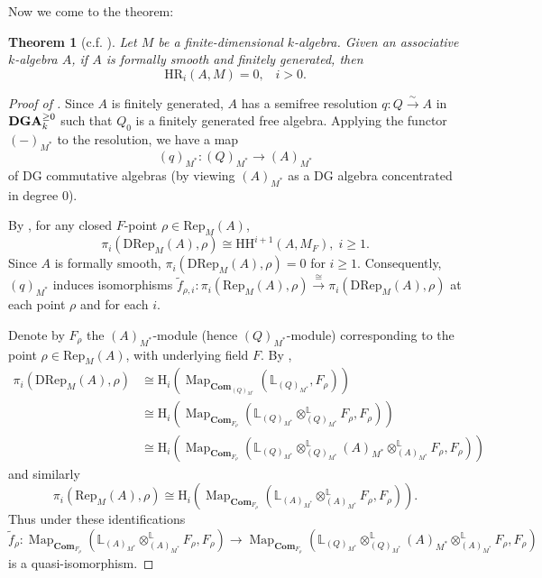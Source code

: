 \documentclass{article}
\numberwithin{equation}{section} %
\theoremstyle{plain}
\newtheorem{theorem}{Theorem}[section]
\theoremstyle{definition}
\theoremstyle{remark}
\begin{document}
Now we come to the theorem:

\begin{theorem}[{c.f. \cite[Theorem 21]{BFR14}}]\label{Thm_SmoothnessHigherVanishing}
Let $M$ be a finite-dimensional $k$-algebra.
Given an associative $k$-algebra $A$, if $A$ is formally smooth and finitely generated, then
\begin{equation*}
\mathrm{HR}_i(A,M)=0,\;\;\;i>0.
\end{equation*}
\end{theorem}

\begin{proof}[Proof of ]
Since $A$ is finitely generated, $A$ has a semifree resolution $q:Q\xrightarrow{\sim}A$ in ${\bf DGA}_k^{\geq0}$ such that $Q_0$ is a finitely generated free algebra.
Applying the functor $(-)_{M^*}$ to the resolution, we have a map
\begin{equation*}
(q)_{M^*}:(Q)_{M^*}\to(A)_{M^*}
\end{equation*}
of DG commutative algebras (by viewing $(A)_{M^*}$ as a DG algebra concentrated in degree $0$).

By , for any closed $F$-point $\rho\in\mathrm{Rep}_M(A)$,
\begin{equation*}
\pi_i(\mathrm{DRep}_M(A),\rho)\cong\mathrm{HH}^{i+1}(A,M_F),\;i\geq1.
\end{equation*}
Since $A$ is formally smooth, $\pi_i(\mathrm{DRep}_M(A),\rho)=0$ for $i\geq1$.
Consequently, $(q)_{M^*}$ induces isomorphisms $\tilde{f}_{\rho,i}:\pi_i(\mathrm{Rep}_M(A),\rho)\xrightarrow{\cong}\pi_i(\mathrm{DRep}_M(A),\rho)$ at each point $\rho$ and for each $i$.

Denote by $F_\rho$ the $(A)_{M^*}$-module (hence $(Q)_{M^*}$-module) corresponding to the point $\rho\in\mathrm{Rep}_M(A)$, with underlying field $F$.
By ,
\begin{align*}
\pi_i(\mathrm{DRep}_M(A),\rho)&\cong\mathrm{H}_i(\operatorname{Map}_{\mathbf{Com}_{(Q)_{M^*}}}(\mathbb{L}_{(Q)_{M^*}},F_\rho))\\
&\cong\mathrm{H}_i(\operatorname{Map}_{\mathbf{Com}_{F_\rho}}(\mathbb{L}_{(Q)_{M^*}}\otimes^\mathbb{L}_{(Q)_{M^*}}F_\rho,F_\rho))\\
&\cong\mathrm{H}_i(\operatorname{Map}_{\mathbf{Com}_{F_\rho}}(\mathbb{L}_{(Q)_{M^*}}\otimes^\mathbb{L}_{(Q)_{M^*}}(A)_{M^*}\otimes^\mathbb{L}_{(A)_{M^*}}F_\rho,F_\rho))
\end{align*}
and similarly
\begin{equation*}
\pi_i(\mathrm{Rep}_M(A),\rho)\cong\mathrm{H}_i(\operatorname{Map}_{\mathbf{Com}_{F_\rho}}(\mathbb{L}_{(A)_{M^*}}\otimes^\mathbb{L}_{(A)_{M^*}}F_\rho,F_\rho)).
\end{equation*}
Thus under these identifications
\begin{equation}
\tilde{f}_{\rho}:\operatorname{Map}_{\mathbf{Com}_{F_\rho}}(\mathbb{L}_{(A)_{M^*}}\otimes^\mathbb{L}_{(A)_{M^*}}F_\rho,F_\rho)\to\operatorname{Map}_{\mathbf{Com}_{F_\rho}}(\mathbb{L}_{(Q)_{M^*}}\otimes^\mathbb{L}_{(Q)_{M^*}}(A)_{M^*}\otimes^\mathbb{L}_{(A)_{M^*}}F_\rho,F_\rho)
\end{equation}
is a quasi-isomorphism.


\end{proof}
\end{document}
